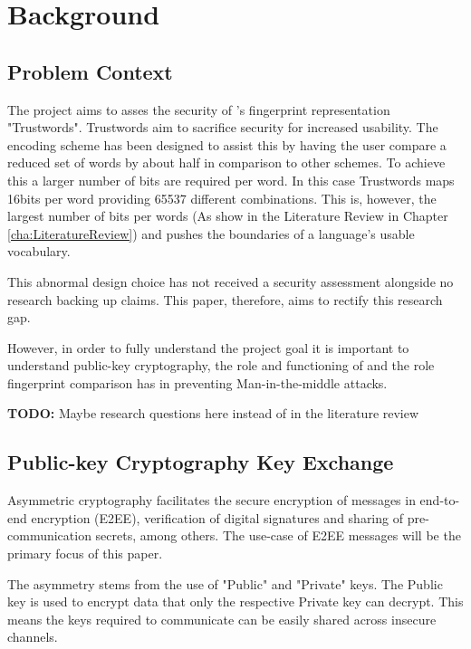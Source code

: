 \chapter{Background}
\label{cha:Background}

\section{Problem Context}
The project aims to asses the security of \pep's fingerprint representation "Trustwords". Trustwords aim to sacrifice security for increased usability. The encoding scheme has been designed to assist this by having  the user compare a reduced set of words by about half in comparison to other schemes. To achieve this a larger number of bits are required per word. In this case Trustwords maps 16bits per word providing 65537 different combinations. This is, however, the largest number of bits per words (As show in the Literature Review in Chapter \ref{cha:LiteratureReview}) and pushes the boundaries of a language's usable vocabulary.

This abnormal design choice has not received a security assessment alongside no research backing up claims. This paper, therefore, aims to rectify this research gap.

However, in order to fully understand the project goal it is important to understand public-key cryptography, the role and functioning of \pep and the role fingerprint comparison has in preventing Man-in-the-middle attacks.

\textbf{TODO:} Maybe research questions here instead of in the literature review

\section{Public-key Cryptography Key Exchange}
Asymmetric cryptography facilitates the secure encryption of messages in end-to-end encryption (E2EE), verification of digital signatures and sharing of pre-communication secrets, among others. The use-case of E2EE messages will be the primary focus of this paper. 

The asymmetry stems from the use of "Public" and "Private" keys. The Public key is used to encrypt data that only the respective Private key can decrypt. This means the keys required to communicate can be easily shared across insecure channels.

